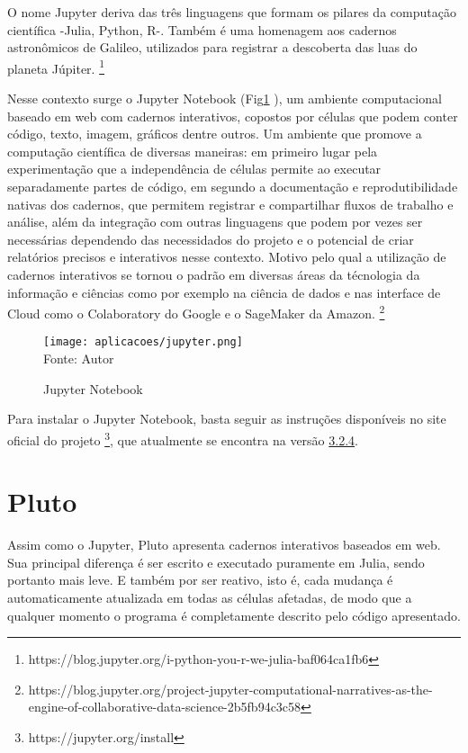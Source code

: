 O nome Jupyter deriva das três linguagens que formam os pilares da computação científica -Julia, Python, R-. Também é uma homenagem aos cadernos astronômicos de Galileo, utilizados para registrar a descoberta das luas do planeta Júpiter. \footnote{https://blog.jupyter.org/i-python-you-r-we-julia-baf064ca1fb6}

Nesse contexto surge o Jupyter Notebook (Fig\ref{jupyter} ), um ambiente computacional baseado em web com cadernos interativos, copostos por células que podem conter código, texto, imagem, gráficos dentre outros. Um ambiente que promove a computação científica de diversas maneiras: em primeiro lugar pela experimentação que a independência de células permite ao executar separadamente partes de código, em segundo a documentação e reprodutibilidade nativas dos cadernos, que permitem registrar e compartilhar fluxos de trabalho e análise, além da integração com outras linguagens que podem por vezes ser necessárias dependendo das necessidados do projeto e o potencial de criar relatórios precisos e interativos nesse contexto. Motivo pelo qual a utilização de cadernos interativos se tornou o padrão em diversas áreas da técnologia da informação e ciências como por exemplo na ciência de dados e nas interface de Cloud como o Colaboratory do Google e o SageMaker da Amazon. \footnote{https://blog.jupyter.org/project-jupyter-computational-narratives-as-the-engine-of-collaborative-data-science-2b5fb94c3c58}

\begin{figure}[H]
\begin{center}
    \caption{Jupyter Notebook} \label{jupyter}
    \texttt{[image: aplicacoes/jupyter.png]} \\
    {\tiny \sf Fonte: Autor}
\end{center}
\end{figure} 



Para instalar o Jupyter Notebook, basta seguir as instruções disponíveis no site oficial do projeto \footnote{https://jupyter.org/install}, que atualmente se encontra na versão \href{https://github.com/jupyterlab/jupyterlab/releases/tag/v3.2.4}{3.2.4}.

\section{Pluto}
Assim como o Jupyter, Pluto apresenta cadernos interativos baseados em web. 
Sua principal diferença é ser escrito e executado puramente em Julia, sendo portanto mais leve. E também por ser reativo, isto é, cada mudança é automaticamente atualizada em todas as células afetadas, de modo que a qualquer momento o programa é completamente descrito pelo código apresentado. 

